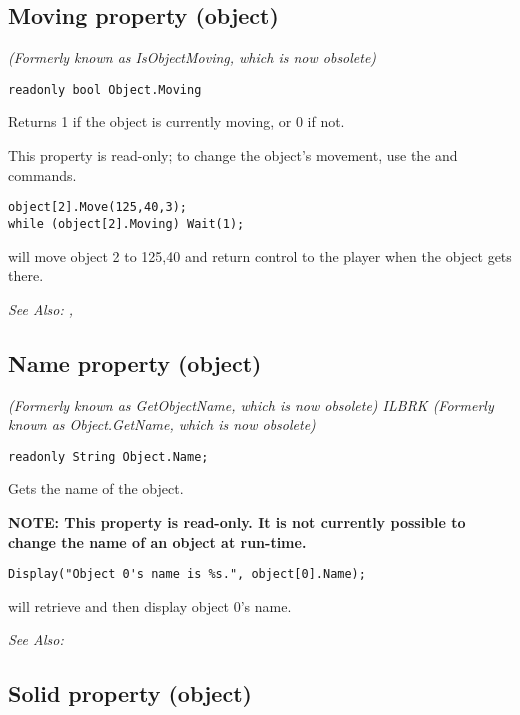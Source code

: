\subsection{Moving property (object)}\label{Object.Moving}%

\it{(Formerly known as IsObjectMoving, which is now obsolete)}

\begin{verbatim}
readonly bool Object.Moving
\end{verbatim}
Returns 1 if the object is currently moving, or 0 if not.

This property is read-only; to change the object's movement, use the 
and  commands.

\begin{verbatim}
object[2].Move(125,40,3);
while (object[2].Moving) Wait(1);
\end{verbatim}
will move object 2 to 125,40 and return control to the player when the object gets there.

\it{See Also:} ,


\subsection{Name property (object)}\label{Object.Name}%

\it{(Formerly known as GetObjectName, which is now obsolete)} ILBRK
\it{(Formerly known as Object.GetName, which is now obsolete)}

\begin{verbatim}
readonly String Object.Name;
\end{verbatim}
Gets the name of the object.

\bf{NOTE}: This property is read-only. It is not currently possible to change the name
of an object at run-time.

\begin{verbatim}
Display("Object 0's name is %s.", object[0].Name);
\end{verbatim}
will retrieve and then display object 0's name.

\it{See Also:} 


\subsection{Solid property (object)}\label{Object.Solid}%

